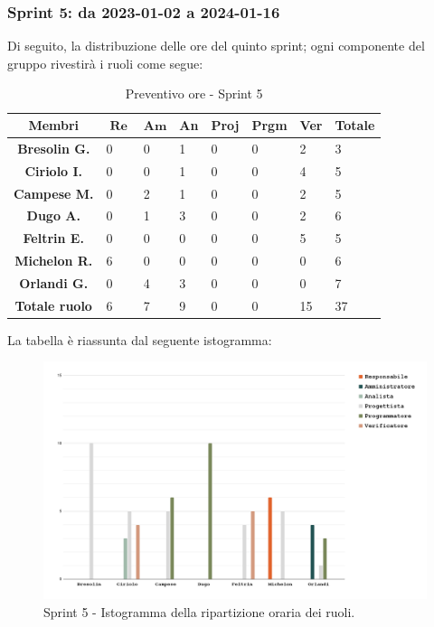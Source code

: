 \documentclass[10pt, a4paper]{article}
\begin{document}
\subsubsection{Sprint 5: da 2023-01-02 a 2024-01-16}
Di seguito, la distribuzione delle ore del quinto sprint; ogni componente del gruppo rivestirà i ruoli come segue:
\begin{table}[H]
    \begin{tabularx}{\textwidth}{c|X|X|X|X|X|X|X}
        \textbf{Membri} & $\operatorname{\textbf{Re}}$ & $\mathrm{\textbf{Am}}$ & \textbf{An} & \textbf{Proj} & \textbf{Prgm} & \textbf{Ver} & \textbf{Totale} \\
        \hline
        \textbf{Bresolin G.} & 0 & 0 & 1 & 0 & 0 & \cellcolor{primarycolor}2 & 3 \\
        \hline
        \textbf{Ciriolo I.}  & 0 & 0 & 1 & 0 & 0 & \cellcolor{primarycolor}4 & 5 \\
        \hline
        \textbf{Campese M.}  & 0 & \cellcolor{primarycolor}2 & 1 & 0 & 0 & 2 & 5 \\
        \hline
        \textbf{Dugo A.}     & 0 & 1 & \cellcolor{primarycolor}3 & 0 & 0 & 2 & 6 \\
        \hline
        \textbf{Feltrin E.}  & 0 & 0 & 0 & 0 & 0 &\cellcolor{primarycolor} 5 & 5 \\
        \hline
        \textbf{Michelon R.} & \cellcolor{primarycolor}6 & 0 & 0 & 0 & 0 & 0 & 6 \\
        \hline
        \textbf{Orlandi G.}  & 0 & 4 & \cellcolor{primarycolor}3 & 0 & 0 & 0 & 7 \\
        \hline
        \textbf{Totale ruolo} & 6 & 7 & 9 & 0 & 0 & 15 & 37 \\
    \end{tabularx}
    \caption{Preventivo ore - Sprint 5}
\end{table}

La tabella è riassunta dal seguente istogramma:
 \begin{figure}[H]
        \centering        
        \includegraphics[width=15.5cm]{istogrammi/istogramma_5_periodo.png}
        \caption{Sprint 5 - Istogramma della ripartizione oraria dei ruoli. }
    \end{figure}
\end{document}
